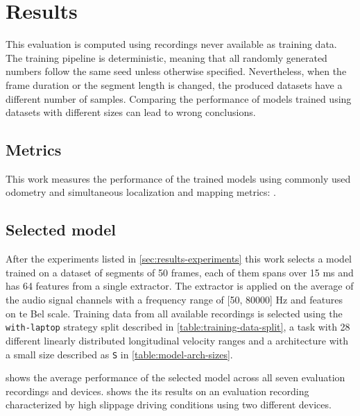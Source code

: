 \section{Results} \label{chap:results}

This evaluation is computed using recordings never available as training data.
The training pipeline is deterministic, meaning that all randomly generated
numbers follow the same seed unless otherwise specified. Nevertheless, when the
frame duration or the segment length is changed, the produced datasets have a
different number of samples. Comparing the performance of models trained using
datasets with different sizes can lead to wrong conclusions.


\subsection{Metrics} \label{sec:metrics} This work measures the performance of
the trained models using commonly used odometry and simultaneous localization
and mapping metrics: \cite{Measuring2019}.

\subsection{Selected model} \label{sec:selected-model}

After the experiments listed in \cref{sec:results-experiments} this work
selects a model trained on a dataset of segments of 50 frames, each of them
spans over 15 ms and has 64 features from a single
 extractor. The extractor is applied on
the average of the audio signal channels with a frequency range of [50, 80000]
Hz and features on te Bel scale. Training data from all available recordings is
selected using the \texttt{with-laptop} strategy split described in
\cref{table:training-data-split}, a  task
with 28 different linearly distributed longitudinal velocity ranges and a
 architecture with a small size described as
\texttt{S} in \cref{table:model-arch-sizes}. 

 shows the average performance of the
selected model across all seven evaluation recordings and devices.
 shows the its results on an evaluation recording
characterized by high slippage driving conditions using two different devices.

